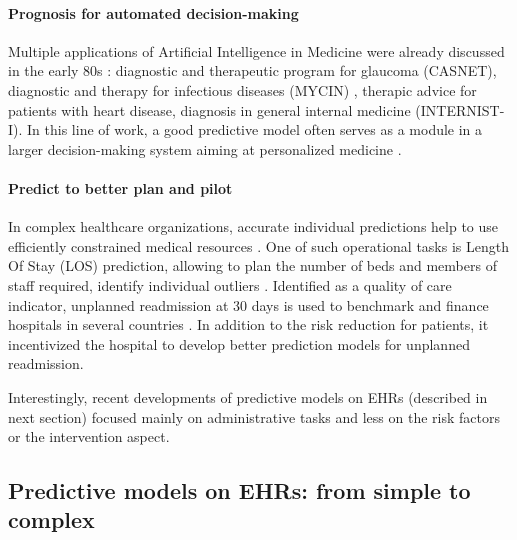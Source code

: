 \documentclass[french,12pt,twoside,a4paper]{book}
\begin{document}
\begin{appendices}
  \paragraph{Prognosis for automated decision-making}
  Multiple applications of Artificial Intelligence in Medicine were already
  discussed in the early 80s \citep[Chapter~1]{Szolovits1982artificial}:
  diagnostic and therapeutic program for glaucoma (CASNET), diagnostic and therapy
  for infectious diseases (MYCIN) \citep{shortliffe1976computer}, therapic advice
  for patients with heart disease, diagnosis in general internal medicine
  (INTERNIST-I). In this line of work, a good predictive model often serves as a
  module in a larger decision-making system aiming at personalized medicine
  \citep{topol2019high}.

  \paragraph{Predict to better plan and pilot}

  In complex healthcare organizations, accurate individual predictions help to
  use efficiently constrained medical resources \citep{topol2019high}. One of such
  operational tasks is Length Of Stay (LOS) prediction, allowing to plan the
  number of beds and members of staff required, identify individual outliers
  \citep{verburg2017models}. %
  Identified as a quality of care indicator, unplanned readmission at 30 days is
  used to benchmark and finance hospitals in several countries
  \citep{cms2019readmission, kristensen2015roadmap}. In addition to the risk
  reduction for patients, it incentivized the hospital to develop better
  prediction models for unplanned readmission.

  Interestingly, recent developments of predictive models on EHRs (described in next section) focused mainly on administrative tasks and
  less on the risk factors or the intervention aspect.

  \subsection{Predictive models on EHRs: from simple to complex}%
  \label{apd:review_models}%


\end{appendices}
\end{document}

